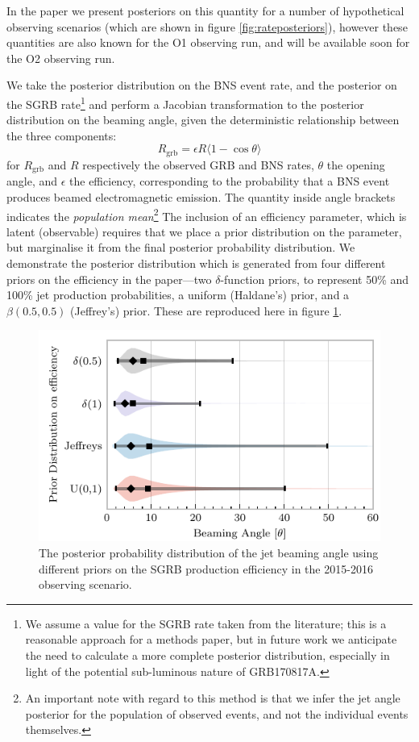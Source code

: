\documentclass{kentigern}
\theoremstyle{definition}
\begin{document}
In the paper we present posteriors on this quantity for a number of
hypothetical observing scenarios (which are shown in figure
\ref{fig:rateposteriors}), however these quantities are also known for
the O1 observing run, and will be available soon for the O2 observing
run.

We take the posterior distribution on the BNS event rate, and the
posterior on the SGRB rate\footnote{We assume a value for the SGRB
  rate taken from the literature; this is a reasonable approach for a
  methods paper, but in future work we anticipate the need to
  calculate a more complete posterior distribution, especially in
  light of the potential sub-luminous nature of GRB170817A.} and
perform a Jacobian transformation to the posterior distribution on the
beaming angle, given the deterministic relationship between the three
components:
\begin{equation}
  \label{eq:sgrb-angle-from-rates}
  R_{\text{grb}} = \epsilon R \langle 1 - \cos\theta \rangle
\end{equation}
for $R_{\text{grb}}$ and $R$ respectively the observed GRB and BNS
rates, $\theta$ the opening angle, and $\epsilon$ the efficiency,
corresponding to the probability that a BNS event produces beamed
electromagnetic emission. The quantity inside angle brackets indicates
the \emph{population mean}\footnote{An important note with regard to
  this method is that we infer the jet angle posterior for the
  population of observed events, and not the individual events
  themselves.} The inclusion of an efficiency parameter, which is
latent (observable) requires that we place a prior distribution on the
parameter, but marginalise it from the final posterior probability
distribution. We demonstrate the posterior distribution which is
generated from four different priors on the efficiency in the
paper---two $\delta$-function priors, to represent 50\% and 100\% jet
production probabilities, a uniform (Haldane's) prior, and a
$\beta(0.5, 0.5)$ (Jeffrey's) prior. These are reproduced here in
figure \ref{fig:o1posterior}.

\begin{figure}
  \includegraphics{figures/sgrb/O1_beaming_posteriors_violin.pdf}
  \caption{The posterior probability distribution of the jet
    beaming angle using different priors on the SGRB production
    efficiency in the 2015-2016 observing scenario. \label{fig:o1posterior}}
  \end{figure}
\end{document}
